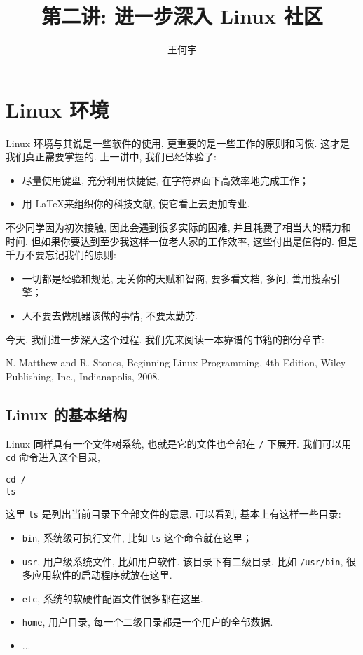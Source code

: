 \documentclass[a4paper]{ctexart}
\title{第二讲: 进一步深入 Linux 社区}
\author{王何宇}
\date{}
\begin{document}
\maketitle
\pagestyle{empty}

\section{Linux 环境}

Linux 环境与其说是一些软件的使用, 更重要的是一些工作的原则和习惯. 这才是我们真正需要掌握的.
上一讲中, 我们已经体验了:

\begin{itemize}
\item 尽量使用键盘, 充分利用快捷键, 在字符界面下高效率地完成工作；
\item 用 \LaTeX 来组织你的科技文献, 使它看上去更加专业.  
\end{itemize}

不少同学因为初次接触, 因此会遇到很多实际的困难, 并且耗费了相当大的精力和时间.
但如果你要达到至少我这样一位老人家的工作效率, 这些付出是值得的. 但是千万不要忘记我们的原则:

\begin{itemize}
\item 一切都是经验和规范, 无关你的天赋和智商, 要多看文档, 多问, 善用搜索引擎；
\item 人不要去做机器该做的事情, 不要太勤劳.
\end{itemize}

今天, 我们进一步深入这个过程. 我们先来阅读一本靠谱的书籍的部分章节:

N. Matthew and R. Stones, Beginning Linux Programming,
4th Edition, Wiley Publishing, Inc.,
Indianapolis, 2008.

\subsection{Linux 的基本结构}

Linux 同样具有一个文件树系统, 也就是它的文件也全部在 \verb|/| 下展开. 我们可以用 \verb|cd| 命令进入这个目录,
\begin{verbatim}
cd /
ls
\end{verbatim}

这里 \verb|ls| 是列出当前目录下全部文件的意思. 可以看到, 基本上有这样一些目录:

\begin{itemize}
\item \verb|bin|, 系统级可执行文件, 比如 \verb|ls| 这个命令就在这里；
\item \verb|usr|, 用户级系统文件, 比如用户软件. 该目录下有二级目录, 比如 \verb|/usr/bin|,
  很多应用软件的启动程序就放在这里.
\item \verb|etc|, 系统的软硬件配置文件很多都在这里.
\item \verb|home|, 用户目录, 每一个二级目录都是一个用户的全部数据. 
\item ...
\end{itemize}
\end{document}
